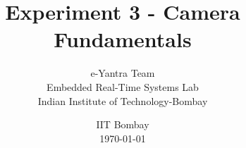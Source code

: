 \documentclass[table,10pt,red]{beamer}	%
\title
[

	\hspace{0.5cm}
	Page \insertframenumber/\inserttotalframenumber
]
{
Experiment 3 - Camera Fundamentals
}
\author
[
	www.e-yantra.org 	%
]
{
	e-Yantra Team \\
  Embedded Real-Time Systems Lab\\
  Indian Institute of Technology-Bombay \\
}
\date
{
IIT Bombay \\ {\today}	%
}
\begin{document}

\begin{frame}	%
	\titlepage %
\end{frame}
\end{document}
